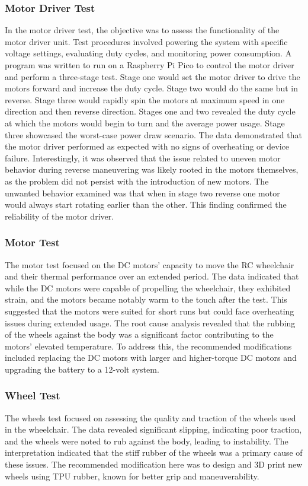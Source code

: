 \documentclass[conference]{IEEEtran}
\begin{document}
        \subsubsection{Motor Driver Test}
        In the motor driver test, the objective was to assess the functionality of the motor driver unit. Test procedures involved powering the system with specific voltage settings, evaluating duty cycles, and monitoring power consumption. A program was written to run on a Raspberry Pi Pico to control the motor driver and perform a three-stage test. Stage one would set the motor driver to drive the motors forward and increase the duty cycle. Stage two would do the same but in reverse. Stage three would rapidly spin the motors at maximum speed in one direction and then reverse direction. Stages one and two revealed the duty cycle at which the motors would begin to turn and the average power usage. Stage three showcased the worst-case power draw scenario. The data demonstrated that the motor driver performed as expected with no signs of overheating or device failure. Interestingly, it was observed that the issue related to uneven motor behavior during reverse maneuvering was likely rooted in the motors themselves, as the problem did not persist with the introduction of new motors. The unwanted behavior examined was that when in stage two reverse one motor would always start rotating earlier than the other. This finding confirmed the reliability of the motor driver.
    
        \subsubsection{Motor Test}
        The motor test focused on the DC motors' capacity to move the RC wheelchair and their thermal performance over an extended period. The data indicated that while the DC motors were capable of propelling the wheelchair, they exhibited strain, and the motors became notably warm to the touch after the test. This suggested that the motors were suited for short runs but could face overheating issues during extended usage. The root cause analysis revealed that the rubbing of the wheels against the body was a significant factor contributing to the motors' elevated temperature. To address this, the recommended modifications included replacing the DC motors with larger and higher-torque DC motors and upgrading the battery to a 12-volt system.
    
        \subsubsection{Wheel Test}
        The wheels test focused on assessing the quality and traction of the wheels used in the wheelchair. The data revealed significant slipping, indicating poor traction, and the wheels were noted to rub against the body, leading to instability. The interpretation indicated that the stiff rubber of the wheels was a primary cause of these issues. The recommended modification here was to design and 3D print new wheels using TPU rubber, known for better grip and maneuverability.
    
\end{document}
